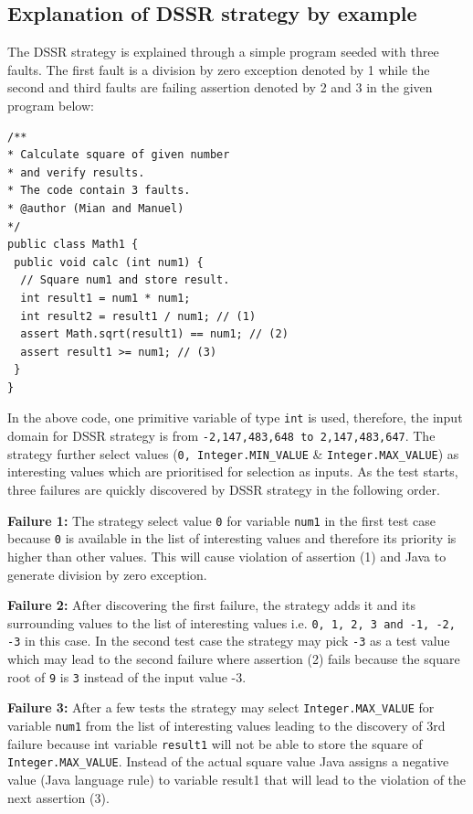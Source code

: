 \subsection{Explanation of DSSR strategy by example}
The DSSR strategy is explained through a simple program seeded with three faults. The first fault is a division by zero exception denoted by 1 while the second and third faults are failing assertion denoted by 2 and 3 in the given program below: 

\begin{lstlisting}
/** 
* Calculate square of given number 
* and verify results. 
* The code contain 3 faults.
* @author (Mian and Manuel)
*/
public class Math1 {
 public void calc (int num1) {
  // Square num1 and store result. 
  int result1 = num1 * num1;
  int result2 = result1 / num1; // (1)
  assert Math.sqrt(result1) == num1; // (2)
  assert result1 >= num1; // (3)
 } 
}
\end{lstlisting}

In the above code, one primitive variable of type \verb+int+ is used, therefore, the input domain for DSSR strategy is from \verb+-2,147,483,648 to 2,147,483,647+. The strategy further select values (\verb+0, Integer.MIN_VALUE+ \& \verb+Integer.MAX_VALUE+) as interesting values which are prioritised for selection as inputs. 
As the test starts, three failures are quickly discovered by DSSR strategy in the following order.

\indent \textbf{Failure 1:} The strategy select value \verb+0+ for variable \verb+num1+  in the first test case because \verb+0+ is available in the list of interesting values and therefore its priority is higher than other values. This will cause violation of assertion (1) and Java to generate division by zero exception.

\indent \textbf{Failure 2:} After discovering the first failure, the strategy adds it and its surrounding values to the list of interesting values i.e. \verb+0, 1, 2, 3 and -1, -2, -3+ in this case. In the second test case the strategy may pick \verb+-3+ as a test value which may lead to the second failure where assertion (2) fails because the square root of \verb+9+ is \verb+3+ instead of the input value -3.

\indent \textbf{Failure 3:} After a few tests the strategy may select \verb+Integer.MAX_VALUE+ for variable \verb+num1+  from the list of interesting values leading to the discovery of 3rd failure because int variable \verb+result1+ will not be able to store the square of \verb+Integer.MAX_VALUE+. Instead of the actual square value Java assigns a negative value (Java language rule) to variable result1 that will lead to the violation of the next assertion (3).

